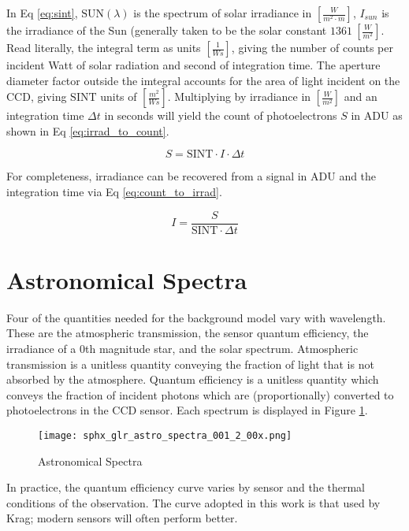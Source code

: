 In Eq \ref{eq:sint}, $\textrm{SUN}(\lambda)$ is the spectrum of solar irradiance in 
$\left[\frac{W}{m^2\cdot m} \right]$, $I_{sun}$ is the irradiance of the Sun (generally taken to be
the solar constant $1361 \: \left[ \frac{W}{m^2} \right]$. Read literally, the integral term as
units $\left[ \frac{1}{Ws} \right]$, giving the number of counts per incident Watt of solar
radiation and second of integration time. The aperture diameter factor outside the imtegral accounts
for the area of light incident on the CCD, giving $\textrm{SINT}$ units of $\left[ \frac{m^2}{Ws}
\right]$. Multiplying by irradiance in $\left[ \frac{W}{m^2} \right]$ and an integration time $\Delta t$ 
in seconds will yield the count of photoelectrons $S$ in ADU as shown in Eq \ref{eq:irrad_to_count}.

\begin{equation} \label{eq:irrad_to_count}
  S = \textrm{SINT} \cdot I \cdot \Delta t
\end{equation}

For completeness, irradiance can be recovered from a signal in ADU and the integration time via Eq
\ref{eq:count_to_irrad}.

\begin{equation} \label{eq:count_to_irrad}
  I = \frac{S}{\textrm{SINT} \cdot \Delta t}
\end{equation}

\section{Astronomical Spectra}

Four of the quantities needed for the background model vary with wavelength. These are the atmospheric
transmission, the sensor quantum efficiency, the irradiance of a 0th magnitude star, and the solar spectrum. Atmospheric transmission is a unitless quantity
conveying the fraction of light that is not absorbed by the atmosphere. Quantum efficiency is a
unitless quantity which conveys the fraction of incident photons which are (proportionally) converted
to photoelectrons in the CCD sensor. Each spectrum is displayed in Figure \ref{fig:spectra}.  

\begin{figure}[ht]
  \centering
  \texttt{[image: sphx\_glr\_astro\_spectra\_001\_2\_00x.png]}
  \caption{Astronomical Spectra}
  \label{fig:spectra}
\end{figure}

In practice, the quantum efficiency curve varies by sensor and the thermal conditions of the
observation. The curve adopted in this work is that used by Krag; modern sensors will often
perform better.
